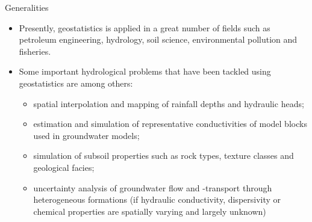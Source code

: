 \documentclass[8pt]{beamer}
\renewcommand{\emph}[1]{\textcolor{myorange}{#1}}
\begin{document}
\begin{frame}{Generalities}
    \begin{itemize}
        \item Presently, \emph{geostatistics} is applied in a great number of fields such as \emph{petroleum engineering}, \emph{hydrology}, \emph{soil science}, \emph{environmental pollution} and \emph{fisheries}.
        \item Some important \emph{hydrological problems} that have been tackled using \emph{geostatistics} are among others: 
            \begin{itemize}
                \item spatial interpolation and mapping of rainfall depths and hydraulic heads;
                \item estimation and simulation of representative conductivities of model blocks used in groundwater models;
                \item simulation of subsoil properties such as rock types, texture classes and geological facies;
                \item uncertainty analysis of groundwater flow and -transport through heterogeneous formations (if hydraulic conductivity, dispersivity or chemical properties are spatially varying and largely unknown) 
    \end{itemize}
    \end{itemize}
\end{frame}

\end{document}
